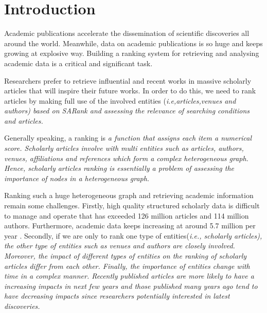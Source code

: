 \section{Introduction}
\label{sec-intro}
\par

Academic publications accelerate the dissemination of scientific discoveries all around the world. Meanwhile, data on academic publications is so huge and keeps growing at explosive way. Building a ranking system for retrieving and analysing academic data is a critical and significant task.



\par
Researchers prefer to retrieve influential and recent works in massive scholarly articles that will inspire their future works. In order to do this, we need to rank articles by making full use of the involved entities (\itshape i.e,\upshape articles,venues and authors) based on SARank \cite{ma2018query} and assessing the relevance of searching conditions and articles.

\par
Generally speaking, a ranking is \itshape a function that assigns each item a numerical score. \upshape Scholarly articles involve with multi entities such as articles, authors, venues, affiliations and references which form a complex heterogeneous graph. Hence, scholarly articles ranking is essentially a problem of assessing the importance of nodes in a heterogeneous graph. 

\par 
Ranking such a huge heterogeneous graph and retrieving academic information remain some challenges. Firstly, high quality structured scholarly data is difficult to manage and operate that has exceeded 126 million articles and 114 million authors. Furthermore, academic data keeps increasing at around 5.7 million per year \cite{sinha2015overview}. Secondly, if we are only to rank one type of entities(\itshape i.e., \upshape scholarly articles), the other type of entities such as venues and authors are closely involved. Moreover, the impact of different types of entities on the ranking of scholarly articles differ from each other. Finally, the importance of entities change with time in a complex manner. Recently published articles are more likely to have a increasing impacts in next few years and those published many years ago tend to have decreasing impacts since researchers potentially interested in latest discoveries.

